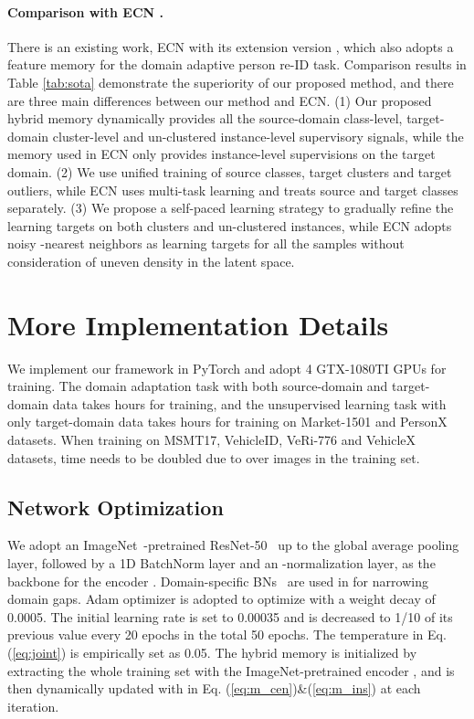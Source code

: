 \documentclass{article}
\begin{document}
\paragraph{Comparison with ECN \cite{zhong2019invariance,zhong2020learning}.}
There is an existing work, ECN \cite{zhong2019invariance} with its extension version \cite{zhong2020learning}, which also adopts a feature memory for the domain adaptive person re-ID task. 
Comparison results in Table \ref{tab:sota} demonstrate the superiority of our proposed method, and there are three main differences between our method and ECN.
(1) Our proposed hybrid memory dynamically provides all the source-domain class-level, target-domain cluster-level and un-clustered instance-level supervisory signals, while the memory used in ECN only provides instance-level supervisions on the target domain.
(2) We use unified training of source classes, target clusters and target outliers,
while ECN uses multi-task learning and treats source and target classes separately.
(3) We propose a self-paced learning strategy to gradually refine the learning targets on both clusters and un-clustered instances, while ECN adopts noisy -nearest neighbors as learning targets for all the samples without consideration of uneven density in the latent space.




\section{More Implementation Details}
\label{sec:app_imp}


We implement our framework in PyTorch \cite{pytorch} and adopt 4 GTX-1080TI GPUs for training\footnotemark[2].
The domain adaptation task with both source-domain and target-domain data takes  hours for training, and the unsupervised learning task with only target-domain data takes  hours for training on Market-1501 and PersonX datasets.
When training on MSMT17, VehicleID, VeRi-776 and VehicleX datasets,
time needs to be doubled due to over  images in the training set.


\subsection{Network Optimization}


We adopt an ImageNet~\cite{deng2009imagenet}-pretrained ResNet-50~\cite{he2016deep} up to the global average pooling layer,
followed by a 1D BatchNorm layer and an -normalization layer,
as the backbone for the encoder .
Domain-specific BNs~\cite{Chang_2019_CVPR} are used in  for narrowing domain gaps.
Adam optimizer is adopted to optimize  with a
weight decay of 0.0005.
The initial learning rate is set to 0.00035 and
is decreased to 1/10 of its previous value every 20 epochs in the total 50 epochs.
The temperature  in Eq. (\ref{eq:joint}) is empirically set as 0.05.
The hybrid memory is initialized by extracting the whole training set with the ImageNet-pretrained encoder ,
and is then dynamically updated with  in Eq. (\ref{eq:m_cen})\&(\ref{eq:m_ins}) at each iteration.
\end{document}
